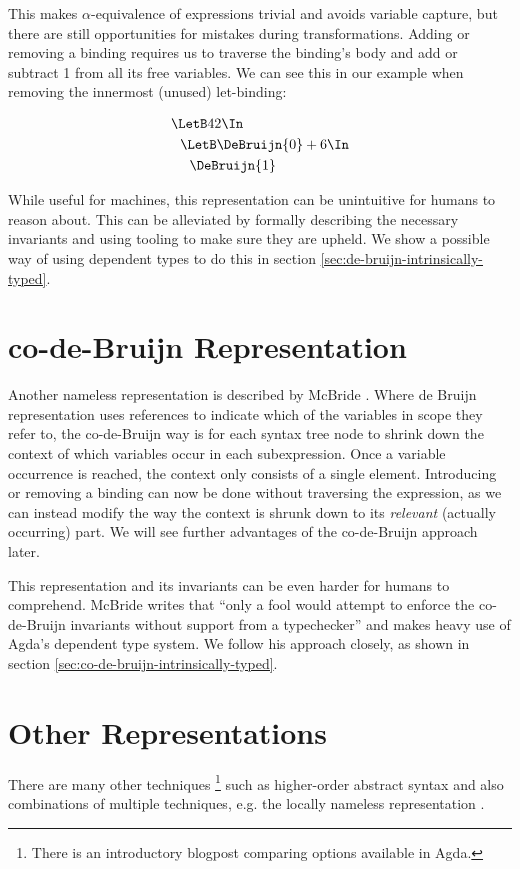 This makes $\alpha$-equivalence of expressions trivial and avoids variable capture,
but there are still opportunities for mistakes during transformations.
Adding or removing a binding
requires us to traverse the binding's body and add or subtract 1 from all its free variables.
We can see this in our example when removing the innermost (unused) let-binding:

\begin{align*}
  &\LetB 42 \In                   \\
  &\ \ \LetB \DeBruijn{0} + 6 \In \\
  &\ \ \ \ \DeBruijn{1}
\end{align*}

While useful for machines, this representation can be unintuitive for humans to reason about.
This can be alleviated by formally describing the necessary invariants
and using tooling to make sure they are upheld.
We show a possible way of using dependent types to do this in section
\ref{sec:de-bruijn-intrinsically-typed}.

\section{co-de-Bruijn Representation}
\label{sec:binding-representation-co-de-bruijn}

Another nameless representation is described by McBride \cite{McBride2018EveryBodysGotToBeSomewhere}.
Where de Bruijn representation uses references to indicate which of the variables in scope they refer to,
the co-de-Bruijn way is for each syntax tree node
to shrink down the context of which variables occur in each subexpression.
Once a variable occurrence is reached, the context only consists of a single element.
Introducing or removing a binding can now be done without traversing the expression,
as we can instead modify the way the context is shrunk down to its \emph{relevant}
(actually occurring) part.
We will see further advantages of the co-de-Bruijn approach later.

This representation and its invariants can be even harder for humans to comprehend.
McBride writes that
``only a fool would attempt to enforce the co-de-Bruijn invariants without support
from a typechecker''
and makes heavy use of Agda's dependent type system.
We follow his approach closely, as shown in section
\ref{sec:co-de-bruijn-intrinsically-typed}.

\section{Other Representations}
\label{sec:binding-representation-other}

There are many other techniques%
\footnote{
There is an introductory blogpost
\cite{Cockx2021RepresentationsBinding}
comparing options available in Agda.
}
such as higher-order abstract syntax
\cite{Pfenning1988HOAS}
and also combinations of multiple techniques, e.g. the locally nameless representation
\cite{Chargueraud2011LocallyNameless}.
